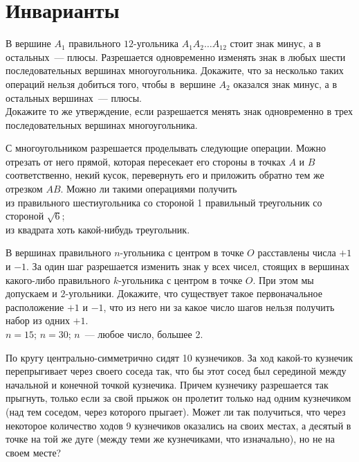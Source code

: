

\section*{Инварианты}


\begin{problems}

\item 
\sbp
В вершине $A_1$ правильного $12$-угольника $A_1 A_2 \ldots A_{12}$ стоит знак
минус, а в остальных~--- плюсы.
Разрешается одновременно изменять знак в любых шести последовательных вершинах
многоугольника.
Докажите, что за несколько таких операций нельзя добиться того, чтобы в~вершине
$A_2$ оказался знак минус, а в остальных вершинах~--- плюсы.
\\
\sbp
Докажите то же утверждение, если разрешается менять знак одновременно в трех
последовательных вершинах многоугольника.

\item
С многоугольником разрешается проделывать следующие операции.
Можно отрезать от него прямой, которая пересекает его стороны в точках $A$ и
$B$ соответственно, некий кусок, перевернуть его и приложить обратно тем же
отрезком $AB$.
Можно ли такими операциями получить 
\\
\sbp
из правильного шестиугольника со стороной 1 правильный треугольник со стороной
$\sqrt{6}$;
\\
\sbp
из квадрата хоть какой-нибудь треугольник.

\item
В вершинах правильного $n$-угольника с центром в точке $O$ расставлены числа
$+1$ и $-1$.
За один шаг разрешается изменить знак у всех чисел, стоящих в вершинах
какого-либо правильного $k$-угольника с центром в точке $O$.
При этом мы допускаем и $2$-угольники.
Докажите, что существует такое первоначальное расположение $+1$ и $-1$, что из
него ни за какое число шагов нельзя получить набор из одних $+1$.
\\
\sbp $n = 15$;
\qquad
\sbp $n = 30$;
\qquad
\sbp $n$~--- любое число, большее 2.

\item
По кругу центрально-симметрично сидят 10 кузнечиков.
За ход какой-то кузнечик перепрыгивает через своего соседа так, что бы этот
сосед был серединой между начальной и конечной точкой кузнечика.
Причем кузнечику разрешается так прыгнуть, только если за свой прыжок он
пролетит только над одним кузнечиком (над тем соседом, через которого прыгает).
Может ли так получиться, что через некоторое количество ходов 9 кузнечиков
оказались на своих местах, а десятый в точке на той же дуге (между теми же
кузнечиками, что изначально), но не на своем месте?

\end{problems}

